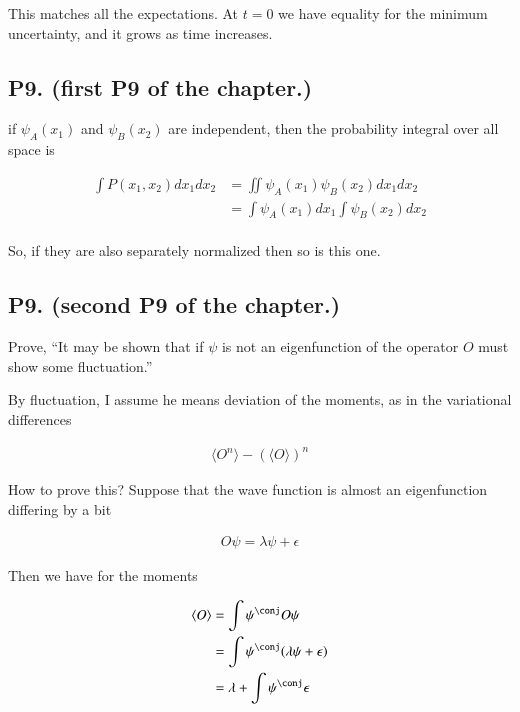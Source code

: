 \documentclass{article}
\newcommand{\expectation}[1]{\langle{#1}\rangle}
\begin{document}
This matches all the expectations.  At $t=0$ we have equality for the minimum uncertainty, and it grows as
time increases.

\subsection{ P9. (first P9 of the chapter.) }

if $\psi_A(x_1)$ and $\psi_B(x_2)$ are independent, then the probability integral over all space is

\begin{align*}
\int P(x_1, x_2) dx_1 dx_2
&=
\iint \psi_A(x_1) \psi_B(x_2) dx_1 dx_2 \\
&=
\int \psi_A(x_1) dx_1 \int \psi_B(x_2) dx_2 \\
\end{align*}

So, if they are also separately normalized then so is this one.

\subsection{ P9. (second P9 of the chapter.) }

Prove, ``It may be shown that if $\psi$ is not an eigenfunction of the operator $O$ must show some fluctuation.''

By fluctuation, I assume he means deviation of the moments, 
as in the variational differences

\begin{align*}
\expectation{O^n} - (\expectation{O})^n 
\end{align*}

How to prove this?  Suppose that the wave function is almost an eigenfunction
differing by a bit

\begin{align*}
O \psi = \lambda \psi + \epsilon
\end{align*}

Then we have for the moments

\begin{align*}
\expectation{O}
&= \int \psi^\conj O \psi \\
&= \int \psi^\conj ( \lambda \psi + \epsilon ) \\
&= \lambda + \int \psi^\conj \epsilon \\
\end{align*}
\end{document}
